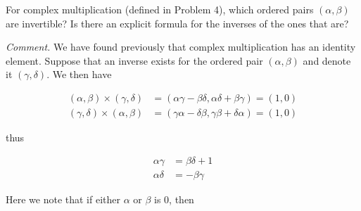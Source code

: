 \begin{problem}
For complex multiplication (defined in Problem 4), which ordered pairs $(\alpha, \beta)$ are invertible? Is there an explicit formula for the inverses of the ones that are?
\end{problem}

\textit{Comment.} We have found previously that complex multiplication has an identity element. Suppose that an inverse exists for the ordered pair $(\alpha, \beta)$ and denote it $(\gamma, \delta)$. We then have

\begin{align}
    (\alpha, \beta) \times (\gamma, \delta) & = (\alpha \gamma - \beta \delta, \alpha \delta + \beta \gamma) = (1,0) \\
    (\gamma, \delta) \times (\alpha, \beta) & = (\gamma\alpha - \delta \beta, \gamma \beta + \delta \alpha) = (1,0)
\end{align}

thus

\begin{align}
    \alpha\gamma & = \beta\delta + 1 \\
    \alpha\delta & = -\beta\gamma
\end{align}

Here we note that if either $\alpha$ or $\beta$ is 0, then